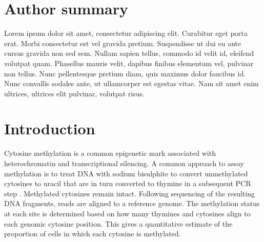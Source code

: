 \documentclass[10pt,letterpaper]{article}
\begin{document}
\section*{Author summary}
Lorem ipsum dolor sit amet, consectetur adipiscing elit. Curabitur eget porta erat. Morbi consectetur est vel gravida pretium. Suspendisse ut dui eu ante cursus gravida non sed sem. Nullam sapien tellus, commodo id velit id, eleifend volutpat quam. Phasellus mauris velit, dapibus finibus elementum vel, pulvinar non tellus. Nunc pellentesque pretium diam, quis maximus dolor faucibus id. Nunc convallis sodales ante, ut ullamcorper est egestas vitae. Nam sit amet enim ultrices, ultrices elit pulvinar, volutpat risus.

\linenumbers


\section*{Introduction}

Cytosine methylation is a common epigenetic mark associated with heterochromatin and transcriptional silencing.
A common approach to assay methylation is to treat DNA with sodium bisulphite to convert unmethylated cytosines to uracil that are in turn converted to thymine in a subsequent PCR step \cite{clark1994high}.
Methylated cytosines remain intact.
Following sequencing of the resulting DNA fragments, reads are aligned to a reference genome.
The methylation status at each site is determined based on how many thymines and cytosines align to each genomic cytosine position.
This gives a quantitative estimate of the proportion of cells in which each cytosine is methylated.
\end{document}
